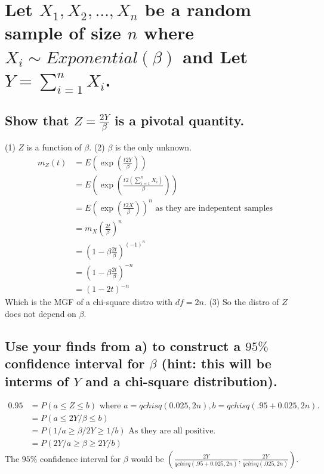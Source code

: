 \documentclass[10pt, letterpaper, titlepage]{article}
\begin{document}
    \section{Let $X_1 , X_2 , \hdots , X_n$ be a random sample of size $n$ where $X_i \sim Exponential(\beta)$
        and Let $Y = \sum_{i = 1}^n X_i$.}
        \subsection{Show that $Z = \frac{2Y}{\beta}$ is a pivotal quantity.}
            (1) $Z$ is a function of $\beta$. (2) $\beta$ is the only unknown.
            \begin{align*}
                m_Z(t) &= E(\exp(\frac{t2Y}{\beta}))\\
                &= E(\exp(\frac{t2(\sum_{i = 1}^n X_i)}{\beta}))\\
                &= E(\exp(\frac{t2X}{\beta}))^n \text{ as they are indepentent samples}\\
                &= m_X(\frac{2t}{\beta})^n\\
                &= (1-\beta \frac{2t}{\beta})^{(-1)^n}\\
                &= (1-\beta \frac{2t}{\beta})^{-n}\\
                &= (1- 2t)^{-n}
            \end{align*}
            Which is the MGF of a chi-square distro with $df = 2n$. (3) So the distro of $Z$ does not depend on $\beta$.
        \subsection{Use your finds from a) to construct a $95\%$ confidence interval for $\beta$ (hint:
        this will be interms of $Y$ and a chi-square distribution).}
            \begin{align*}
                0.95 &= P(a \leq Z \leq b) \text{ where $a = qchisq(0.025,2n), b = qchisq(.95+0.025,2n)$.}\\
                &= P(a \leq 2Y / \beta \leq b)\\
                &= P(1/a \geq \beta / 2Y \geq 1/b) \text{ As they are all positive.}\\
                &= P(2Y/a \geq \beta \geq 2Y/b)
            \end{align*}
            The $95\%$ confidence interval for $\beta$ would be 
            $(\frac{2Y}{qchisq(.95 + 0.025, 2n)}, \frac{2Y}{qchisq(.025, 2n)})$.

    \newpage
\end{document}
